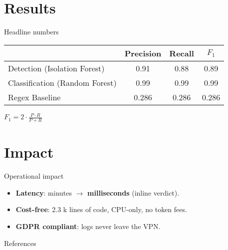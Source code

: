 \documentclass[15pt,aspectratio=169]{beamer}
\newcommand{\IForest}{Isolation Forest\xspace}
\newcommand{\RForest}{Random Forest\xspace}
\newcommand{\LOC}{lines of code\xspace}
\begin{document}
\section{Results}

\begin{frame}{Headline numbers}
\centering
\begin{tabular}{lccc}
  \toprule
   & Precision & Recall & $F_{1}$ \\
  \midrule
  Detection (\IForest) & 0.91 & 0.88 & 0.89 \\
  Classification (\RForest) & 0.99 & 0.99 & 0.99 \\
  \midrule
  Regex Baseline & 0.286 & 0.286 & 0.286 \\
  \bottomrule
\end{tabular}

\vspace{.8em}
\small
$F_{1} = 2 \cdot \frac{P \cdot R}{P + R}$
\end{frame}

\section{Impact}

\begin{frame}{Operational impact}
\begin{itemize}[<+->]
  \item \textbf{Latency}: minutes $\rightarrow$ \textbf{milliseconds} (inline verdict).
  \item \textbf{Cost-free}: 2.3 k \LOC{}, CPU-only, no token fees.
  \item \textbf{GDPR compliant}: logs never leave the VPN.
\end{itemize}
\end{frame}

\begin{frame}{References}
  \tiny
  \begin{multicols}{2}
    \printbibliography[heading=none]
  \end{multicols}
\end{frame}
\end{document}
